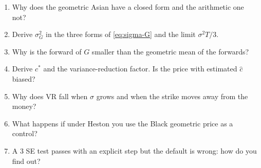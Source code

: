 \begin{domande}
\begin{enumerate}
\item Why does the geometric Asian have a closed form and the arithmetic one not?
\item Derive $\sigma_G^2$ in the three forms of \eqref{eq:sigma-G} and the limit $\sigma^2T/3$.
\item Why is the forward of $G$ smaller than the geometric mean of the forwards?
\item Derive $c^*$ and the variance-reduction factor. Is the price with estimated $\hat c$ biased?
\item Why does VR fall when $\sigma$ grows and when the strike moves away from the money?
\item What happens if under Heston you use the Black geometric price as a control?
\item A 3 SE test passes with an explicit step but the default is wrong: how do you find out?
\end{enumerate}
\end{domande}
